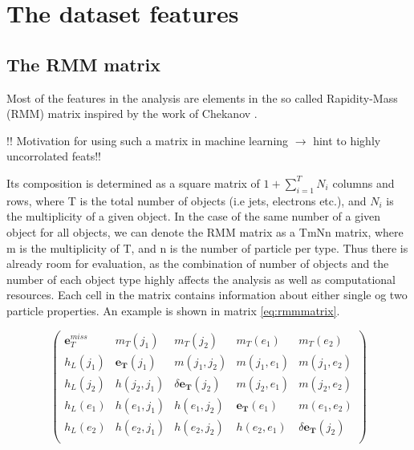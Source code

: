 \section*{The dataset features}

\subsection*{The RMM matrix}
Most of the features in the analysis are elements in the so called Rapidity-Mass (RMM) matrix inspired by the work of Chekanov \cite{Chekanov_2019}.
\par
!! Motivation for using such a matrix in machine learning $\to$ hint to highly uncorrolated feats!!
\par
Its composition is determined as a square matrix of $1 + \sum_{i=1}^{T}N_i$ columns and rows, where T is the total number of objects (i.e jets, electrons etc.),
and $N_i$ is the multiplicity of a given object. In the case of the same number of a given object for all objects, we can denote the RMM matrix as a 
TmNn matrix, where m is the multiplicity of T, and n is the number of particle per type. Thus there is already room for evaluation, as the combination of number of objects 
and the number of each object type highly affects the analysis as well as computational resources. Each cell in the matrix contains information about
either single og two particle properties. An example is shown in matrix \ref{eq:rmmmatrix}.

\begin{equation}\label{eq:rmmmatrix}
\begin{pmatrix}
    \boldsymbol{e}_{T}^{miss} & m_T(j_1) & m_T(j_2) &  m_T(e_1) &  m_T(e_2)\\
    h_L(j_1) & \boldsymbol{e_T}(j_1) & m(j_1, j_2) & m(j_1, e_1) & m(j_1, e_2)\\
    h_L(j_2) & h(j_2, j_1) & \delta \boldsymbol{e_T}(j_2)& m(j_2, e_1) & m(j_2, e_2)\\
    h_L(e_1) & h(e_1, j_1) & h(e_1, j_2) & \boldsymbol{e_T}(e_1) & m(e_1, e_2)\\
    h_L(e_2) & h(e_2, j_1) & h(e_2, j_2) & h(e_2, e_1) & \delta \boldsymbol{e_T}(j_2)\\
\end{pmatrix}
\end{equation}

